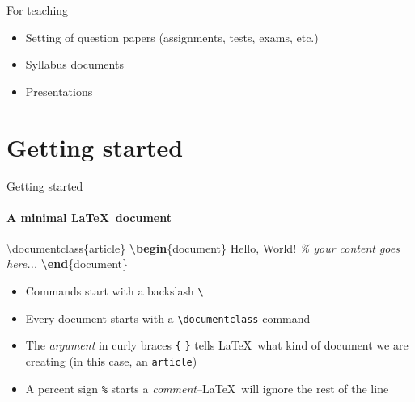 \documentclass[,aspectratio=43]{beamer}
\newenvironment{Shaded}{\begin{snugshade}}{\end{snugshade}}
\newcommand{\BuiltInTok}[1]{#1}
\newcommand{\CommentTok}[1]{\textcolor[rgb]{0.38,0.63,0.69}{\textit{#1}}}
\newcommand{\ExtensionTok}[1]{#1}
\newcommand{\KeywordTok}[1]{\textcolor[rgb]{0.00,0.44,0.13}{\textbf{#1}}}
\newcommand{\NormalTok}[1]{#1}
\providecommand{\tightlist}{%
  \setlength{\itemsep}{0pt}\setlength{\parskip}{0pt}}
\begin{document}
\begin{frame}{For teaching}
\protect\hypertarget{for-teaching}{}
\begin{itemize}
\tightlist
\item
  Setting of question papers (assignments, tests, exams, etc.)
\item
  Syllabus documents
\item
  Presentations
\end{itemize}
\end{frame}

\hypertarget{getting-started}{%
\section{Getting started}\label{getting-started}}

\begin{frame}[fragile]{Getting started}
\protect\hypertarget{getting-started-1}{}
\framesubtitle{A minimal \LaTeX\ document}

\begin{Shaded}
\begin{Highlighting}[]
\BuiltInTok{\textbackslash{}documentclass}\NormalTok{\{}\ExtensionTok{article}\NormalTok{\}}
\KeywordTok{\textbackslash{}begin}\NormalTok{\{}\ExtensionTok{document}\NormalTok{\}}
\NormalTok{Hello, World!  }\CommentTok{\% your content goes here...}
\KeywordTok{\textbackslash{}end}\NormalTok{\{}\ExtensionTok{document}\NormalTok{\}}
\end{Highlighting}
\end{Shaded}

\begin{itemize}
\item
  Commands start with a backslash \texttt{\textbackslash{}}
\item
  Every document starts with a \texttt{\textbackslash{}documentclass}
  command
\item
  The \emph{argument} in curly braces \texttt{\{} \texttt{\}} tells
  \LaTeX~what kind of document we are creating (in this case, an
  \texttt{article})
\item
  A percent sign \texttt{\%} starts a \emph{comment}--\LaTeX~will ignore
  the rest of the line
\end{itemize}
\end{frame}
\end{document}
